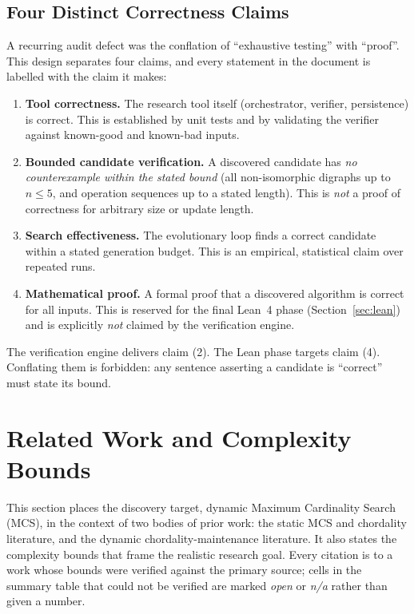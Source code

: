 \documentclass[12pt,a4paper]{article}
\begin{document}
\subsection{Four Distinct Correctness Claims}

A recurring audit defect was the conflation of ``exhaustive testing'' with ``proof''. This design separates four claims, and every statement in the document is labelled with the claim it makes:

\begin{enumerate}[noitemsep]
  \item \textbf{Tool correctness.} The research tool itself (orchestrator, verifier, persistence) is correct. This is established by unit tests and by validating the verifier against known-good and known-bad inputs.
  \item \textbf{Bounded candidate verification.} A discovered candidate has \emph{no counterexample within the stated bound} (all non-isomorphic digraphs up to $n \le 5$, and operation sequences up to a stated length). This is \emph{not} a proof of correctness for arbitrary size or update length.
  \item \textbf{Search effectiveness.} The evolutionary loop finds a correct candidate within a stated generation budget. This is an empirical, statistical claim over repeated runs.
  \item \textbf{Mathematical proof.} A formal proof that a discovered algorithm is correct for all inputs. This is reserved for the final Lean~4 phase (Section~\ref{sec:lean}) and is explicitly \emph{not} claimed by the verification engine.
\end{enumerate}

The verification engine delivers claim (2). The Lean phase targets claim (4). Conflating them is forbidden: any sentence asserting a candidate is ``correct'' must state its bound.

\section{Related Work and Complexity Bounds}
\label{sec:related}

This section places the discovery target, dynamic Maximum Cardinality Search (MCS), in the context of two bodies of prior work: the static MCS and chordality literature, and the dynamic chordality-maintenance literature. It also states the complexity bounds that frame the realistic research goal. Every citation is to a work whose bounds were verified against the primary source; cells in the summary table that could not be verified are marked \textit{open} or \textit{n/a} rather than given a number.
\end{document}
